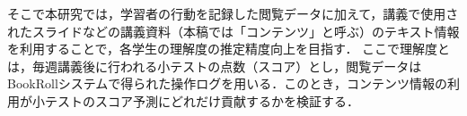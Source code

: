 \documentclass[platex,dvipdfmx,a4paper,twocolumn,base=10pt,jbase=10pt,ja=standard]{bxjsarticle}
\begin{document}


そこで本研究では，学習者の行動を記録した閲覧データに加えて，講義で使用されたスライドなどの講義資料（本稿では「コンテンツ」と呼ぶ）のテキスト情報を利用することで，各学生の理解度の推定精度向上を目指す．
ここで理解度とは，毎週講義後に行われる小テストの点数（スコア）とし，閲覧データはBookRollシステムで得られた操作ログを用いる．このとき，コンテンツ情報の利用が小テストのスコア予測にどれだけ貢献するかを検証する．








\end{document}
